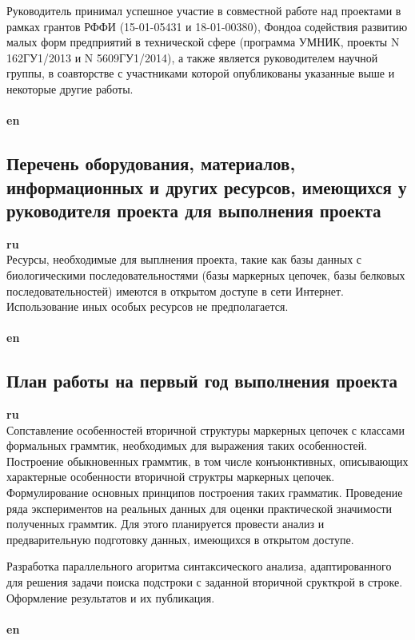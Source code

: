 ﻿\documentclass[12pt]{article}  %
\theoremstyle{remark}
\begin{document}
Руководитель принимал успешное участие в совместной работе над проектами в рамках грантов РФФИ (15-01-05431 и 18-01-00380), Фондоа содействия развитию малых форм предприятий в технической сфере
(программа УМНИК, проекты N 162ГУ1/2013 и N 5609ГУ1/2014), а также является руководителем научной группы, в соавторстве с участниками которой опубликованы указанные выше и некоторые другие работы.
\\
\\
\textbf{en}\\

\subsection{Перечень оборудования, материалов, информационных и других ресурсов, имеющихся у руководителя проекта для выполнения проекта }
\textbf{ru}\\
Ресурсы, необходимые для выплнения проекта, такие как базы данных с биологическими последовательностями (базы маркерных цепочек, базы белковых последовательностей) имеются в открытом доступе в сети Интернет.
Использование иных особых ресурсов не предполагается.
\\
\\
\textbf{en}\\


\subsection{План работы на первый год выполнения проекта}

\textbf{ru}\\
Сопставление особенностей вторичной структуры маркерных цепочек с классами формальных граммтик, необходимых для выражения таких особенностей. Построение обыкновенных граммтик, в том числе конъюнктивных, описывающих характерные особенности вторичной структры маркерных цепочек.
Формулирование основных принципов построения таких грамматик.
Проведение ряда экспериментов на реальных данных для оценки практической значимости полученных граммтик. Для этого планируется провести анализ и предварительную подготовку данных, имеющихся в открытом доступе.

Разработка параллельного агоритма синтаксического анализа, адаптированного для решения задачи поиска подстроки с заданной вторичной срукткрой в строке.
Оформление результатов и их публикация.
\\
\\
\textbf{en}\\
\end{document}
